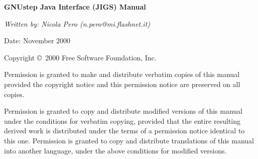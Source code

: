 %
%
%
\begin{titlepage}
\begin{flushleft}
{\phantom{begin page}}
\vskip6cm

{\LARGE\bf GNUstep Java Interface (JIGS) Manual\par}

\vskip1cm

{\sl Written by:  Nicola Pero (n.pero@mi.flashnet.it)

Date: November 2000}
\end{flushleft}

\vskip3cm

{\sc Copyright \copyright\ 2000 Free Software Foundation, Inc.}

Permission is granted to make and distribute verbatim copies of this
manual provided the copyright notice and this permission notice are
preserved on all copies.

Permission is granted to copy and distribute modified versions of this
manual under the conditions for verbatim copying, provided that the
entire resulting derived work is distributed under the terms of a
permission notice identical to this one.  Permission is granted to
copy and distribute translations of this manual into another language,
under the above conditions for modified versions.

\end{titlepage}





